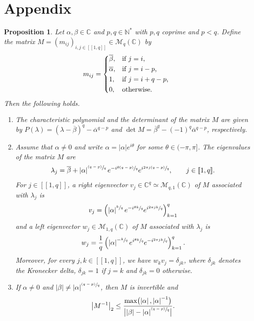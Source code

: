 \documentclass[JEP,XML,SOM,Unicode]{cedram}
\newcommand{\psfrac}[2]{\sfrac{(#1)}{#2}}
\newcommand{\llbracket}{[\![}
\newcommand{\rrbracket}{]\!]}
\theoremstyle{plain}
\newtheorem{prop}[theo]{Proposition}
\theoremstyle{definition}
\newcommand{\abs}[1]{\left\lvert #1\right \rvert}
\newcommand{\babs}[1]{\bigl\lvert #1\bigr \rvert}
\begin{document}
\appendix

\section*{Appendix}
\label{AppM}

\begin{prop}
\label{AppPropM}
Let $\alpha, \beta \in \mathbb C$ and $p, q \in \mathbb N^\ast$ with $p, q$ coprime and $p < q$. Define the matrix $M = (m_{ij})_{i, j \in \llbracket 1, q\rrbracket} \in \mathcal M_{q}(\mathbb C)$ by
\begin{equation}
\label{DefMij}
m_{ij} =
\begin{dcases*}
\overline\beta, & if $j = i$, \\
\overline\alpha, & if $j = i - p$, \\
1, & if $j = i + q - p$, \\
0, & otherwise.
\end{dcases*}
\end{equation}
Then the following holds.

\begin{enumerate}
\item\label{AppCharactPolyM} The characteristic polynomial and the determinant of the matrix $M$ are given by $P(\lambda) = \left(\lambda - \overline\beta\right)^q - \overline\alpha^{q - p}$ and $\det M = \overline\beta^q - (-1)^q \overline\alpha^{q - p}$, respectively.

\item\label{AppEigenvectorsM} Assume that $\alpha \neq 0$ and write $\alpha = \abs{\alpha} e^{i\theta}$ for some $\theta \in (-\pi, \pi]$. The eigenvalues of the matrix $M$ are
\begin{equation}
\label{EigenvaluesM}
\lambda_j = \overline\beta + \abs{\alpha}^{\psfrac{q - p}{q}} e^{-i\sfrac{\theta(q - p)}{q}} e^{i \sfrac{2\pi j (q - p)}{q}}, \qquad j \in \llbracket 1, q\rrbracket.
\end{equation}
For $j \in \llbracket 1, q\rrbracket$, a right eigenvector $v_j \in \mathbb C^q \simeq \mathcal M_{q, 1}(\mathbb C)$ of $M$ associated with $\lambda_j$ is
\[
v_j = \left(\abs{\alpha}^{\sfrac{k}{q}} e^{-i \sfrac{\theta k}{q}} e^{i \sfrac{2\pi j k}{q}}\right)_{k=1}^q
\]
and a left eigenvector $w_j \in \mathcal M_{1, q}(\mathbb C)$ of $M$ associated with $\lambda_j$ is
\[
w_j = \frac{1}{q} \left(\abs{\alpha}^{-\sfrac{k}{q}} e^{i \sfrac{\theta k}{q}} e^{-i \sfrac{2\pi j k}{q}}\right)_{k=1}^q.
\]
Moreover, for every $j, k \in \llbracket 1, q\rrbracket$, we have $w_k v_j = \delta_{jk}$, where $\delta_{jk}$ denotes the Kronecker delta, \ie $\delta_{jk} = 1$ if $j = k$ and $\delta_{jk} = 0$ otherwise.

\item\label{AppInverseM} If $\alpha \neq 0$ and $\abs{\beta} \neq \abs{\alpha}^{\psfrac{q - p}{q}}$, then $M$ is invertible and
\[\abs{M^{-1}}_{2} \leq \frac{\max\bigl(\abs{\alpha}, \abs{\alpha}^{-1}\bigr)}{\babs{\abs{\beta} - \abs{\alpha}^{\psfrac{q - p}{q}}}}.\]
\end{enumerate}
\end{prop}
\end{document}
